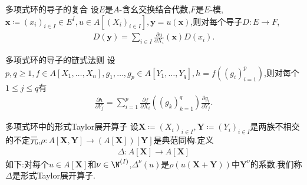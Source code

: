 \begin{proposition}{多项式环的导子的复合}{}
	设$E$是$A$-含幺交换结合代数,$F$是$E$-模,$\mathbf{x}\coloneq\left(x_{i}\right)_{i\in I}\in E^{I},u\in A[(X_{i})_{i\in I}],\mathbf{y}=u\left(\mathbf{x}\right)$,则对每个导子$D:E\to F$,
	\begin{align*}
		D\left(\mathbf{y}\right)=\sum\limits_{i\in I}\frac{\partial u}{\partial X_{i}}\left(\mathbf{x}\right)D\left(x_{i}\right).
	\end{align*}
\end{proposition}

\begin{corollary}{多项式环的导子的链式法则}{}
	设$p,q\geq 1,f\in A[X_{1},\ldots,X_{n}],g_{1},\ldots,g_{p}\in A[Y_{1},\ldots,Y_{q}],h=f\left(\left(g_{i}\right)_{i=1}^{p}\right)$,则对每个$1\leq j\leq q$有
	\begin{align*}
		\frac{\partial h}{\partial Y_{j}}=\sum\limits_{i=1}^{p}\frac{\partial f}{\partial X_{i}}\left(\left(g_{k}\right)_{k=1}^{q}\right)\frac{\partial g_{i}}{\partial Y_{j}}.
	\end{align*}
\end{corollary}

\begin{definition}{多项式环中的形式Taylor展开算子}{}
	设$\mathbf{X}\coloneq(X_{i})_{i\in I},\mathbf{Y}\coloneq\left(Y_{i}\right)_{i\in I}$是两族不相交的不定元,$\rho:A[\mathbf{X},\mathbf{Y}]\to\left(A[\mathbf{X}]\right)[\mathbf{Y}]$是典范同构.定义
	\begin{align*}
		\Delta:A[\mathbf{X}]\to A[\mathbf{X}]
	\end{align*}
	如下:对每个$u\in A[\mathbf{X}]$和$\nu\in\N^{\left(I\right)}$,$\Delta^{\nu}\left(u\right)$是$\rho\left(u\left(\mathbf{X}+\mathbf{Y}\right)\right)$中$\mathbf{Y}^{\nu}$的系数.我们称$\Delta$是形式Taylor展开算子.
\end{definition}

